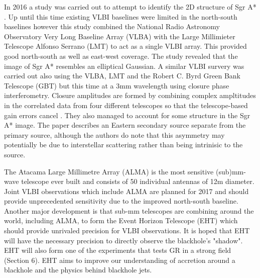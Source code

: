 \documentclass[a4paper,12pt]{article}
\begin{document}
In 2016 a study was carried out to attempt to identify the 2D structure of Sgr A* \citep{ortiz}. Up until this time existing VLBI baselines were limited in the north-south baselines however this study
combined the National Radio Astronomy Observatory Very Long Baseline Array (VLBA) with the Large Millimieter Telescope Alfonso Serrano (LMT) to act as a single VLBI array. This provided good north-south as
well as east-west coverage. The study revealed that the image of Sgr A* resembles an elliptical Gaussian. 
A similar VLBI survery was carried out \citep{brinkerink} also using the VLBA, LMT and the Robert C. Byrd Green Bank Telescope (GBT) but this time at a 3mm wavelength using closure phase
interferometry. Closure amplitudes are formed by combining complex ampltitudes in the correlated data from four different telescopes so that the telescope-based gain errors cancel \citep{falke1}.
They also managed to account for some structure in the Sgr A* image. The paper describes an Eastern secondary source separate from the primary source, although the authors do
note that this asymmetry may potentially be due to interstellar scattering rather than being intrinisic to the source.

The Atacama Large Millimetre Array (ALMA) is the most sensitive (sub)mm-wave telescope ever built and consists of 50 individual antennas of 12m diameter. Joint VLBI observations which include ALMA are 
planned
for 2017 and should provide unprecedented sensitivity due to the improved north-south baseline. Another major development is that sub-mm telescopes are combining around the world, including ALMA, to 
form the Event Horizon Telescope (EHT) which should 
provide unrivaled precision for VLBI observations. It is hoped that EHT will have the necessary precision to directly observe the blackhole's "shadow". EHT will also form one of the experiments
that tests GR in a strong field (Section 6). EHT aims to improve our understanding of accretion around a blackhole and the physics behind blackhole jets.
\end{document}
